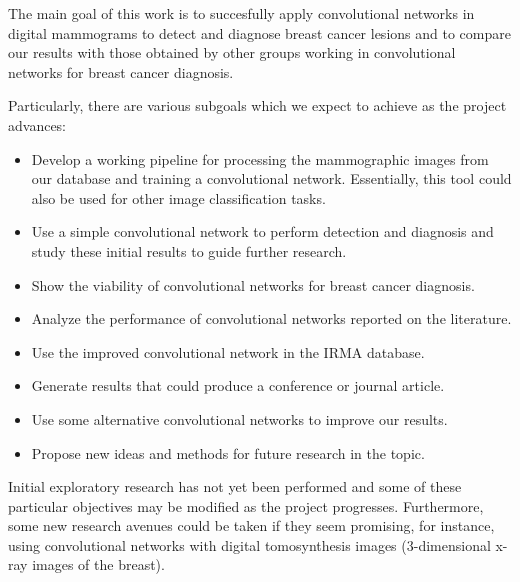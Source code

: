 The main goal of this work is to succesfully apply convolutional networks in digital mammograms to detect and diagnose breast cancer lesions and to compare our results with those obtained by other groups working in convolutional networks for breast cancer diagnosis.

Particularly, there are various subgoals which we expect to achieve as the project advances:
\begin{itemize}
	\item Develop a working pipeline for processing the mammographic images from our database and training a convolutional network. Essentially, this tool could also be used for other image classification tasks.
	\item Use a simple convolutional network to perform detection and diagnosis and study these initial results to guide further research.
	\item Show the viability of convolutional networks for breast cancer diagnosis.
	\item Analyze the performance of convolutional networks reported on the literature.
	\item Use the improved convolutional network in the IRMA database.
	\item Generate results that could produce a conference or journal article.
	\item Use some alternative convolutional networks to improve our results.
	\item Propose new ideas and methods for future research in the topic.
\end{itemize}
Initial exploratory research has not yet been performed and some of these particular objectives may be modified as the project progresses. Furthermore, some new research avenues could be taken if they seem promising, for instance, using convolutional networks with digital tomosynthesis images (3-dimensional x-ray images of the breast).


